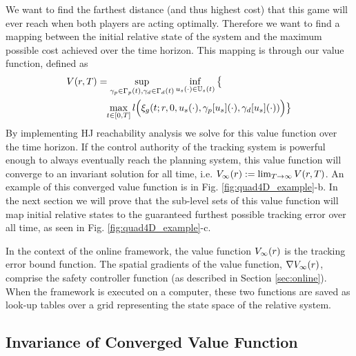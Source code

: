  We want to find the farthest distance (and thus highest cost) that this game will ever reach when both players are acting optimally. Therefore we want to find a mapping between the initial relative state of the system and the maximum possible cost achieved over the time horizon. This mapping is through our value function, defined as
 \begin{equation}
 \begin{aligned}
 \label{eq:valfunc}
 	&V(\rstate,\thor)= \sup_{\gamma_{\pstate} \in \Gamma_\pstate(t), \gamma_{\dstb} \in \Gamma_\dstb(t)} \inf_{\tctrl(\cdot) \in \tcfset(t)} \big\{\\
  &\qquad\qquad \max_{\tvar\in [0, \thor]} \errfunc\Big(\rtraj(\tvar; \rstate, 0, \tctrl(\cdot), \gamma_\pstate[\tctrl](\cdot), \gamma_\dstb[\tctrl](\cdot))\Big)\big\}
 	\end{aligned}
 \end{equation} 
 By implementing HJ reachability analysis we solve for this value function over the time horizon. If the control authority of the tracking system is powerful enough to always eventually reach the planning system, this value function will converge to an invariant solution for all time, i.e. $V_\infty(r) := \lim_{T\rightarrow\infty} V(r, T)$. An example of this converged value function is in Fig. \ref{fig:quad4D_example}-b. In the next section we will prove that the sub-level sets of this value function will map initial relative states to the guaranteed furthest possible tracking error over all time, as seen in Fig. \ref{fig:quad4D_example}-c.
 
In the context of the online framework, the value function $V_\infty(r)$ is the tracking error bound function. The spatial gradients of the value function, $\nabla V_\infty(r)$, comprise the safety controller function (as described in Section \ref{sec:online}). When the framework is executed on a computer, these two functions are saved as look-up tables over a grid representing the state space of the relative system.
 
\subsection{Invariance of Converged Value Function}

